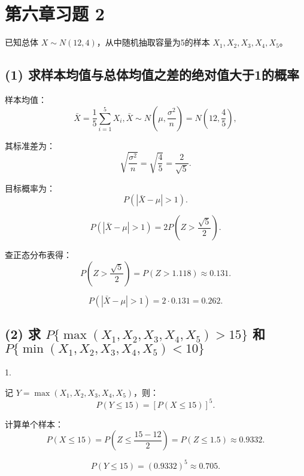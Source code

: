 \documentclass[twoside]{article}
\begin{document}
\maketitle
\vspace{-3.5em}

\tableofcontents

\section{第六章习题 2}

\begin{ans}{2}{2}
    已知总体 \( X \sim N(12, 4) \)，从中随机抽取容量为5的样本 \( X_1, X_2, X_3, X_4, X_5 \)。

    \subsection*{(1) 求样本均值与总体均值之差的绝对值大于1的概率}
    
    样本均值：
    \[
    \bar{X} = \frac{1}{5} \sum_{i=1}^{5} X_i, \bar{X} \sim N\left( \mu, \frac{\sigma^2}{n} \right) = N\left( 12, \frac{4}{5} \right),
    \]
    
    其标准差为：
    \[
    \sqrt{\frac{\sigma^2}{n}} = \sqrt{\frac{4}{5}} = \frac{2}{\sqrt{5}}.
    \]
    
    目标概率为：
    \[
    P(|\bar{X} - \mu| > 1).
    \]
    
    \[
    P(|\bar{X} - \mu| > 1) = 2P\left(Z > \frac{\sqrt{5}}{2}\right).
    \]
    
    查正态分布表得：
    \[
    P(Z > \frac{\sqrt{5}}{2}) = P(Z > 1.118) \approx 0.131.
    \]
    
    \[
    P(|\bar{X} - \mu| > 1) = 2 \cdot 0.131 = 0.262.
    \]
    
    \subsection*{(2) 求 \( P\{\max(X_1, X_2, X_3, X_4, X_5) > 15\} \) 和 \( P\{\min(X_1, X_2, X_3, X_4, X_5) < 10\} \)}
    
    1. 
    
    记 \( Y = \max(X_1, X_2, X_3, X_4, X_5) \)，则：
    \[
    P(Y \leq 15) = [P(X \leq 15)]^5.
    \]
    
    计算单个样本：
    \[
    P(X \leq 15) = P\left(Z \leq \frac{15 - 12}{2}\right) = P(Z \leq 1.5) \approx 0.9332.
    \]
    
    \[
    P(Y \leq 15) = (0.9332)^5 \approx 0.705.
    \]
    

\end{ans}
\end{document}
